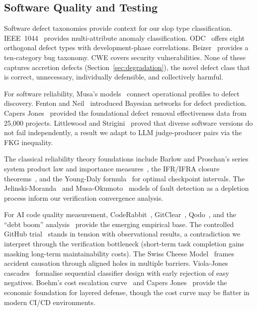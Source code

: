 \subsection{Software Quality and Testing}

Software defect taxonomies provide context for our slop type classification. IEEE~1044~\citep{ieee1044} provides multi-attribute anomaly classification. ODC~\citep{chillarege1992} offers eight orthogonal defect types with development-phase correlations. Beizer~\citep{beizer1990} provides a ten-category bug taxonomy. CWE covers security vulnerabilities. None of these captures accretion defects (Section~\ref{sec:degradation}), the novel defect class that is correct, unnecessary, individually defensible, and collectively harmful.

For software reliability, Musa's models~\citep{musa1987} connect operational profiles to defect discovery. Fenton and Neil~\citep{fenton1999} introduced Bayesian networks for defect prediction. Capers Jones~\citep{capersjones2012} provided the foundational defect removal effectiveness data from 25,000 projects. Littlewood and Strigini~\citep{littlewood1993, littlewood2000} proved that diverse software versions do not fail independently, a result we adapt to LLM judge-producer pairs via the FKG inequality.

The classical reliability theory foundations include Barlow and Proschan's series system product law and importance measures~\citep{barlow1965mathematical, barlow1975statistical}, the IFR/IFRA closure theorems~\citep{birnbaum1961stochastic}, and the Young-Daly formula~\citep{young1974first, daly2006higher} for optimal checkpoint intervals. The Jelinski-Moranda~\citep{jelinski1972software} and Musa-Okumoto~\citep{musa1984logarithmic} models of fault detection as a depletion process inform our verification convergence analysis.

For AI code quality measurement, CodeRabbit~\citep{coderabbit2025}, GitClear~\citep{gitclear2025}, Qodo~\citep{qodo2025}, and the ``debt boom'' analysis~\citep{debtboom2026} provide the emerging empirical base. The controlled GitHub trial~\citep{github2024rct} stands in tension with observational results, a contradiction we interpret through the verification bottleneck (short-term task completion gains masking long-term maintainability costs). The Swiss Cheese Model~\citep{reason1990} frames accident causation through aligned holes in multiple barriers. Viola-Jones cascades~\citep{violajones2004} formalise sequential classifier design with early rejection of easy negatives. Boehm's cost escalation curve~\citep{boehm1981} and Capers Jones~\citep{capersjones2012} provide the economic foundation for layered defense, though the cost curve may be flatter in modern CI/CD environments.

